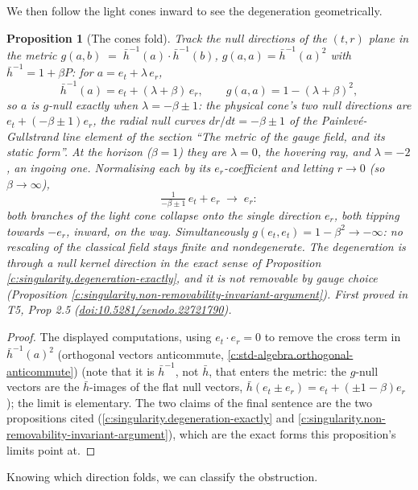 \documentclass[11pt]{article}
\newtheorem{proposition}[theorem]{Proposition}
\theoremstyle{definition}
\theoremstyle{plain}
\providecommand{\er}{}\renewcommand{\er}{e_r}
\providecommand{\et}{}\renewcommand{\et}{e_t}
\providecommand{\hb}{}\renewcommand{\hb}{\bar{h}}
\begin{document}
We then follow the light cones inward to see the degeneration geometrically.

\begin{proposition}[The cones fold]\label{c:singularity.cones-fold}
Track the null directions of the $(t,r)$ plane in the metric $g(a,b) \;=\; \hb^{-1}(a) \cdot \hb^{-1}(b)$, $g(a,a) = \hb^{-1}(a)^{2}$ with $\hb^{-1} = 1 + \beta P$: for $a = \et + \lambda\,\er$,
\[
\hb^{-1}(a) = \et + (\lambda + \beta)\,\er, \qquad g(a,a) = 1 - (\lambda + \beta)^2 ,
\]
so $a$ is $g$-null exactly when $\lambda = -\beta \pm 1$: the physical cone's two null directions are $\et + (-\beta \pm 1)\er$, the radial null curves $dr/dt = -\beta \pm 1$ of the Painlev\'e-Gullstrand line element of the section ``The metric of the gauge field, and its static form''. At the horizon ($\beta = 1$) they are $\lambda = 0$, the hovering ray, and $\lambda = -2$, an ingoing one. Normalising each by its $\er$-coefficient and letting $r \to 0$ (so $\beta \to \infty$),
\[
\tfrac{1}{-\beta \pm 1}\,\et + \er \;\longrightarrow\; \er :
\]
both branches of the light cone collapse onto the single direction $\er$, both tipping towards $-\er$, inward, on the way. Simultaneously $g(\et, \et) = 1 - \beta^2 \to -\infty$: no rescaling of the classical field stays finite and nondegenerate. The degeneration is through a null kernel direction in the exact sense of Proposition \ref{c:singularity.degeneration-exactly}, and it is not removable by gauge choice (Proposition \ref{c:singularity.non-removability-invariant-argument}).
\emph{First proved in} T5, Prop 2.5 (\href{https://doi.org/10.5281/zenodo.22721790}{doi:10.5281/zenodo.22721790}).
\end{proposition}
\begin{proof}
The displayed computations, using $\et \cdot \er = 0$ to remove the cross term in $\hb^{-1}(a)^{2}$ (orthogonal vectors anticommute, \ref{c:std-algebra.orthogonal-anticommute}) (note that it is $\hb^{-1}$, not $\hb$, that enters the metric: the $g$-null vectors are the $\hb$-images of the flat null vectors, $\hb(\et \pm \er) = \et + (\pm 1 - \beta)\er$); the limit is elementary. The two claims of the final sentence are the two propositions cited (\ref{c:singularity.degeneration-exactly} and \ref{c:singularity.non-removability-invariant-argument}), which are the exact forms this proposition's limits point at.

\end{proof}

Knowing which direction folds, we can classify the obstruction.
\end{document}
